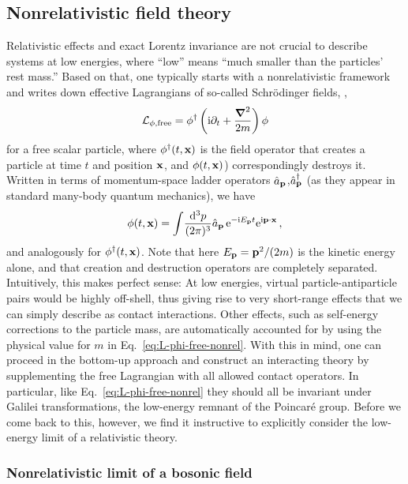 \subsection{Nonrelativistic field theory}

Relativistic effects and exact Lorentz invariance are not crucial to describe 
systems at low energies, where ``low'' means ``much smaller than the particles' 
rest mass.''  Based on that, one typically starts with a nonrelativistic 
framework and writes down effective Lagrangians of so-called Schr\"odinger 
fields, \eg,
%
\begin{equation}
 \LL_{\phi,\text{free}}
 = \phi^\dagger \left(\ii\partial_t + \frac{\Laplace}{2m}\right)\phi
\label{eq:L-phi-free-nonrel}
\end{equation}
%
for a free scalar particle, where $\phi^\dagger(t,\mathbf{x})$ is the field operator 
that creates a particle at time $t$ and position $\mathbf{x}$, and $\phi(t,\mathbf{x})$)
correspondingly destroys it.  Written in terms of momentum-space ladder 
operators $\hat{a}_{\mathbf{p}}$,$\hat{a}^\dagger_{\mathbf{p}}$ (as they appear in standard 
many-body quantum mechanics), we have
%
\begin{equation}
 \phi(t,\mathbf{x})
 = \int\!\frac{\mathrm{d}^3p}{(2\pi)^3} \hat{a}_{\mathbf{p}} \,\mathrm{e}^{-\mathrm{i} E_{\mathbf{p}} t} 
 \mathrm{e}^{\mathrm{i}\mathbf{p}\cdot\mathbf{x}} \,,
\end{equation}
%
and analogously for $\phi^\dagger(t,\mathbf{x})$.  Note that here $E_{\mathbf{p}} = 
\mathbf{p}^2/(2m)$ is the kinetic energy alone, and that creation and destruction 
operators are completely separated.  Intuitively, this makes perfect sense: 
At low energies, virtual particle-antiparticle pairs would be highly 
off-shell, thus giving rise to very short-range effects that we can 
simply describe as contact interactions.  Other effects, such as self-energy 
corrections to the particle mass, are automatically accounted for by using the 
physical value for $m$ in Eq.~\eqref{eq:L-phi-free-nonrel}.  With this in mind, 
one can proceed in the bottom-up approach and construct an interacting theory 
by supplementing the free Lagrangian with all allowed contact operators.  In 
particular, like Eq.~\eqref{eq:L-phi-free-nonrel} they should all be invariant 
under Galilei transformations, the low-energy remnant of the Poincar{\'e} 
group.  Before we come back to this, however, we find it instructive to 
explicitly consider the low-energy limit of a relativistic theory.

\subsubsection{Nonrelativistic limit of a bosonic field}
\label{sec:EFT-NonRelBos}

